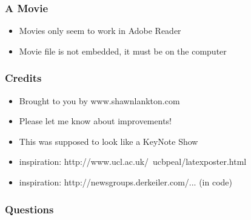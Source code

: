 \documentclass{article}
\begin{document}
\begin{frame}
  \frametitle{A Movie}
  \begin{center}
  \end{center}
  \begin{itemize}
  \item Movies only seem to work in Adobe Reader
  \item Movie file is not embedded, it must be on the computer
  \end{itemize}
\end{frame}


\begin{frame}
  \frametitle{Credits}
  \begin{itemize}
  \item Brought to you by www.shawnlankton.com
  \item Please let me know about improvements!
  \item This was supposed to look like a KeyNote Show
  \item inspiration: http://www.ucl.ac.uk/~ucbpeal/latexposter.html
  \item inspiration: http://newsgroups.derkeiler.com/... (in code)
  \end{itemize}
\end{frame}

\begin{frame}
  \frametitle{Questions}
\end{frame}
\end{document}
